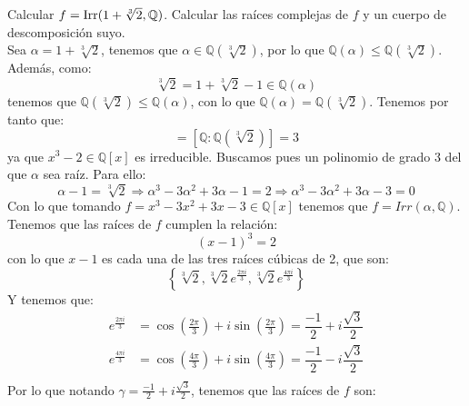 \begin{ejercicio}
    Calcular $f= \operatorname{Irr}(1+\sqrt[3]{2},\mathbb{Q})$. Calcular las raíces complejas de $f$ y un cuerpo de descomposición suyo.\\

    \noindent
    Sea $\alpha = 1+ \sqrt[3]{2}$, tenemos que $\alpha\in \mathbb{Q}\left(\sqrt[3]{2}\right)$, por lo que $\mathbb{Q}(\alpha)\leq \mathbb{Q}\left(\sqrt[3]{2}\right)$. Además, como:
    \begin{equation*}
        \sqrt[3]{2} = 1+\sqrt[3]{2} - 1 \in \mathbb{Q}(\alpha)
    \end{equation*}
    tenemos que $\mathbb{Q}\left(\sqrt[3]{2}\right) \leq \mathbb{Q}(\alpha)$, con lo que $\mathbb{Q}(\alpha) = \mathbb{Q}\left(\sqrt[3]{2}\right)$. Tenemos por tanto que:
    \begin{equation*}
        [\mathbb{Q}:\mathbb{Q}(\alpha)] = \left[\mathbb{Q}:\mathbb{Q}\left(\sqrt[3]{2}\right)\right] = 3
    \end{equation*}
    ya que $x^3-2\in \mathbb{Q}[x]$ es irreducible. Buscamos pues un polinomio de grado 3 del que $\alpha$ sea raíz. Para ello: 
    \begin{equation*}
        \alpha - 1 = \sqrt[3]{2} \Longrightarrow \alpha^3 - 3\alpha^2 + 3\alpha - 1 = 2 \Longrightarrow \alpha^3 - 3\alpha^2 + 3\alpha - 3 = 0
    \end{equation*}
    Con lo que tomando $f = x^3-3x^2+3x-3\in \mathbb{Q}[x]$ tenemos que $f=Irr(\alpha,\mathbb{Q})$. Tenemos que las raíces de $f$ cumplen la relación:
    \begin{equation*}
        {(x-1)}^{3} = 2
    \end{equation*}
    con lo que $x-1$ es cada una de las tres raíces cúbicas de 2, que son:
    \begin{equation*}
        \left\{\sqrt[3]{2}, \sqrt[3]{2}e^{\frac{2\pi i}{3}}, \sqrt[3]{2}e^{\frac{4\pi i}{3}}\right\}
    \end{equation*}
    Y tenemos que:
    \begin{align*}
        e^{\frac{2\pi i}{3}} &= \cos\left(\frac{2\pi}{3}\right) + i\sin\left(\frac{2\pi}{3}\right) = \dfrac{-1}{2}+i\dfrac{\sqrt{3}}{2} \\
        e^{\frac{4\pi i}{3}} &= \cos\left(\frac{4\pi}{3}\right) + i\sin\left(\frac{4\pi}{3}\right) = \dfrac{-1}{2}-i\dfrac{\sqrt{3}}{2} \\
    \end{align*}
    Por lo que notando $\gamma = \frac{-1}{2}+i\frac{\sqrt{3}}{2}$, tenemos que las raíces de $f$ son:

\end{ejercicio}

